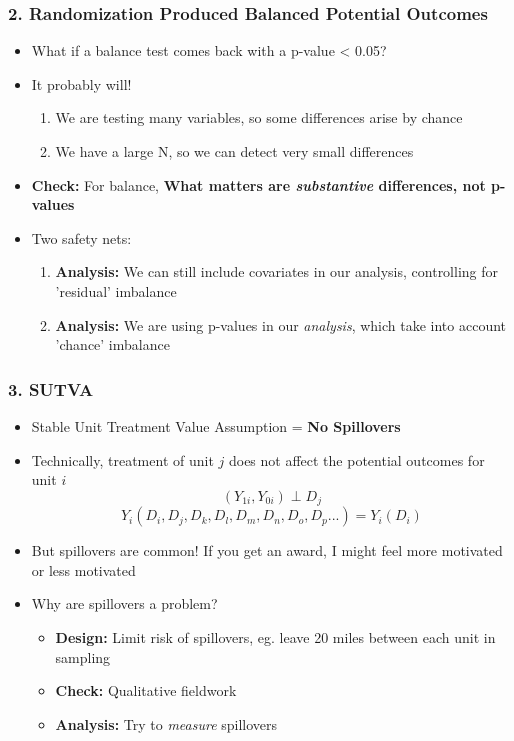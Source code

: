 \documentclass[xcolor=x11names,compress]{beamer}\usepackage[]{graphicx}\usepackage[]{color}
\renewcommand{\(}{\begin{columns}}
\renewcommand{\)}{\end{columns}}
\newcommand{\<}[1]{\begin{column}{#1}}
\renewcommand{\>}{\end{column}}
\begin{document}
\begin{frame}
\frametitle{2. Randomization Produced Balanced Potential Outcomes}
\begin{itemize}
\item What if a balance test comes back with a p-value < 0.05?
\pause
\item It probably will!
\begin{enumerate}
\item We are testing many variables, so some differences arise by chance
\pause
\item We have a large N, so we can detect very small differences
\pause
\end{enumerate}
\item \textbf{Check:} For balance, \textbf{What matters are \textit{substantive} differences, not p-values}
\pause
\item Two safety nets:
\begin{enumerate}
\item \textbf{Analysis:} We can still include covariates in our analysis, controlling for 'residual' imbalance
\pause
\item \textbf{Analysis:} We are using p-values in our \textit{analysis}, which take into account 'chance' imbalance
\pause
\end{enumerate}
\end{itemize}
\end{frame}

\begin{frame}
\frametitle{3. SUTVA}
\begin{itemize}
\item Stable Unit Treatment Value Assumption = \textbf{No Spillovers}
\pause
\item Technically, treatment of unit $j$ does not affect the potential outcomes for unit $i$
\pause
$$(Y_{1i}, Y_{0i}) \perp D_j$$
\pause
$$Y_i(D_i, D_j, D_k, D_l, D_m, D_n, D_o, D_p...) = Y_i(D_i)$$
\pause
\item But spillovers are common! If you get an award, I might feel more motivated or less motivated
\pause
\item Why are spillovers a problem?
\pause
\begin{itemize}
\item \textbf{Design:} Limit risk of spillovers, eg. leave 20 miles between each unit in sampling
\item \textbf{Check:} Qualitative fieldwork
\item \textbf{Analysis:} Try to \textit{measure} spillovers
\end{itemize}
\end{itemize}
\end{frame}
\end{document}
